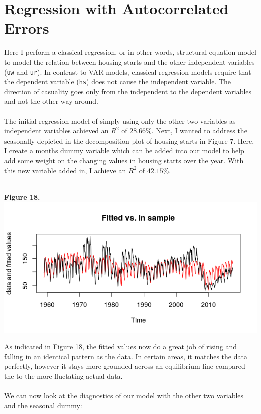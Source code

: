 \documentclass[11pt]{article}
\begin{document}
\section{Regression with Autocorrelated Errors}
Here I perform a classical regression, or in other words, structural equation model to model the relation between housing starts and the other independent variables ({\tt uw} and {\tt ur}). In contrast to VAR models, classical regression models require that the dependent variable ({\tt hs}) does not cause the independent variable. The direction of casuality goes only from the independent to the dependent variables and not the other way around. 
\\\\
The initial regression model of simply using only the other two variables as independent variables achieved an $R^2$ of 28.66$\%$. Next, I wanted to address the seasonally depicted in the decomposition plot of housing starts in Figure 7. Here, I create a months dummy variable which can be added into our model to help add some weight on the changing values in housing starts over the year. With this new variable added in, I achieve an $R^2$ of $42.15\%$.
\\\\
\begin{center}
\textbf{Figure 18.}
\\
\includegraphics[scale=1]{fitIn}
\end{center}
As indicated in Figure 18, the fitted values now do a great job of rising and falling in an identical pattern as the data. In certain areas, it matches the data perfectly, however it stays more grounded across an equilibrium line compared the to the more fluctating actual data.
\\\\
We can now look at the diagnostics of our model with the other two variables and the seasonal dummy:
\end{document}
